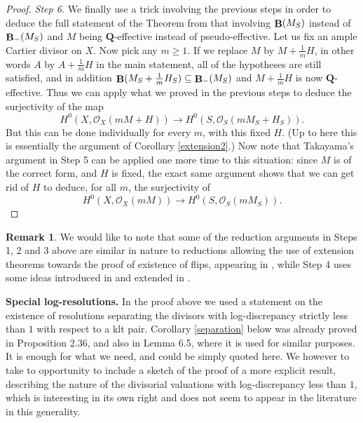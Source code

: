 \documentclass[11pt]{amsart}
\theoremstyle{plain}
\theoremstyle{definition}
\newtheorem{remark}[theorem]{Remark}
\newcommand{\QQ}{\mathbf{Q}}
\newcommand{\OO}{\mathcal  {O}}
\DeclareMathOperator{\BB}{{\bf B}}
\begin{document}
\begin{proof}
\noindent
\emph{Step 6.}
We finally use a trick involving the previous steps in order to deduce the full statement of the Theorem 
from that involving $\BB(M_S)$ instead of $\BB_{-} (M_S)$ and $M$ being $\QQ$-effective instead of pseudo-effective.
Let us fix an ample Cartier divisor on $X$. Now pick any $m \ge 1$. If we replace $M$ by $ M + \frac{1}{m} H$, in other 
words $A$ by $A + \frac{1}{m}H$ in the main statement, all of the hypotheses are still satisfied, and in addition 
$\BB (M_S + \frac{1}{m}  H_S) \subseteq \BB_{-} (M_S)$ and $M + \frac{1}{m} H$ is now $\QQ$-effective. Thus we can apply what 
we proved in the previous steps to deduce the surjectivity of the map
$$H^0 (X, \OO_X (mM+ H)) \longrightarrow H^0 (S, \OO_S (mM_S+ H_S)).$$
But this can be done individually for every $m$, with this fixed $H$. (Up to here this is essentially the argument of
Corollary \ref{extension2}.) Now note that Takayama's argument in Step 5 can be applied one more time to this 
situation: since $M$ is of the correct form, and $H$ is fixed, the exact same argument shows that we can get rid of 
$H$ to deduce, for all $m$, the surjectivity of 
$$H^0 (X, \OO_X (mM)) \longrightarrow H^0 (S, \OO_S (mM_S)).$$
\end{proof}




\begin{remark}
We would like to note that some of the reduction arguments in Steps 1, 2 and 3 above are similar in nature to reductions allowing the use of extension theorems towards the proof of existence of flips, appearing in \cite{hm1}, while  Step 4 uses some ideas introduced in \cite{kawamata} and extended in \cite{hm1}.  
\end{remark}


\noindent
{\bf Special log-resolutions.}
In the proof above we used a statement on the existence of resolutions separating the divisors with log-discrepancy 
strictly less than $1$ with respect to a klt pair. Corollary \ref{separation} below was already proved in \cite{km} Proposition 2.36, and also in \cite{hm2} Lemma 6.5, where it is used for similar purposes. It is enough for what we need, and could 
be simply quoted here. We however to take to opportunity 
to include a sketch of the proof of a more explicit result, describing the nature of the divisorial valuations with log-discrepancy less than $1$, which is interesting in its own right and does not seem to appear in the literature in this generality.
\end{document}
